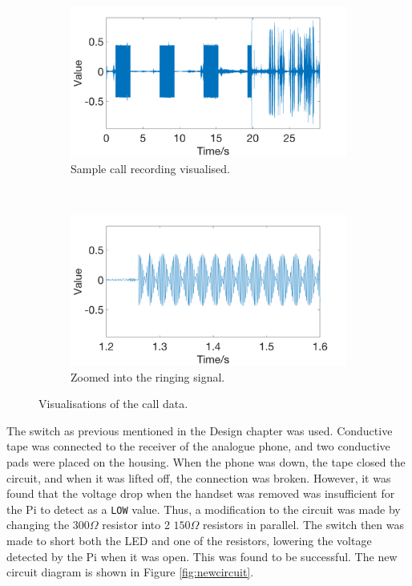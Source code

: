 \documentclass[main.tex]{subfiles}
\begin{document}
\begin{figure}[H]
	\captionsetup[subfigure]{position=b}
        \centering
        \begin{subfigure}{\textwidth}
                \includegraphics[width=\textwidth]{pics/wave1}
                \caption{Sample call recording visualised.}
                \label{fig:wave1}
        \end{subfigure}
        \\
        \begin{subfigure}{\textwidth}
                \includegraphics[width=\textwidth]{pics/wave2}
                \caption{Zoomed into the ringing signal.}
                \label{fig:wave2}
        \end{subfigure}
	\caption{Visualisations of the call data.}
	\label{fig:wave}
\end{figure}

The switch as previous mentioned in the Design chapter was used. Conductive tape was connected to the receiver of the analogue phone, and two conductive pads were placed on the housing. When the phone was down, the tape closed the circuit, and when it was lifted off, the connection was broken. However, it was found that the voltage drop when the handset was removed was insufficient for the Pi to detect as a \texttt{LOW} value. Thus, a modification to the circuit was made by changing the $300\Omega$ resistor into 2 $150\Omega$ resistors in parallel. The switch then was made to short both the LED and one of the resistors, lowering the voltage detected by the Pi when it was open. This was found to be successful. The new circuit diagram is shown in Figure \ref{fig:newcircuit}.
\end{document}
